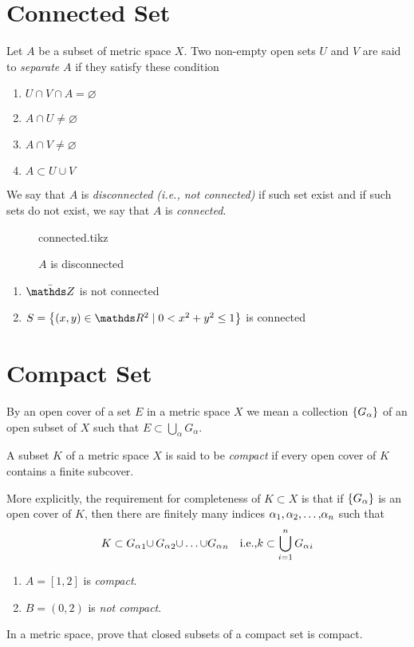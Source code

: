 \documentclass[../main-sheet.tex]{subfiles}
\begin{document}
\section{Connected Set}
Let $ A $ be a subset of metric space $ X $. Two non-empty open sets $ U $ and $ V $ are said to \emph{separate} $ A $ if they satisfy these condition
\begin{enumerate}[noitemsep,label=(\roman*)]
    \item $ U\cap V\cap A=\varnothing $
    \item $ A\cap U\neq\varnothing $
    \item $ A\cap V\neq \varnothing $
    \item $ A\subset U\cup V $
\end{enumerate}
We say that $ A  $ is \emph{disconnected (i.e., not connected)} if such set exist and if such sets do not exist, we say that $ A $ is \emph{connected}.
\begin{figure}[H]
    \centering
    {connected.tikz}
    \caption{$ A $ is disconnected}
    \label{fig:conSet}
\end{figure}
\begin{ex}
    \hfill
    \begin{enumerate}[label=(\roman*)]
        \item $ \bar{\Z} $ is not connected
        \item $ S=\set{(x,y)\in\R^2\mid 0<x^2+y^2\leq 1} $ is connected
    \end{enumerate}
\end{ex}
\section{Compact Set}
By an open cover of a set $ E $ in a metric space $ X $ we mean a collection $ \left\{G_\alpha\right\} $ of an open subset of $ X $ such that $ E\subset \bigcup_\alpha G_\alpha $.

A subset $ K $ of a metric space $ X $ is said to be \emph{compact} if every open cover of $ K $ contains a finite subcover.

More explicitly, the requirement for completeness of $ K\subset X $ is that if $ \left\{G_\alpha\right\} $ is an open cover of $ K $, then there are finitely many indices $ {\alpha}_1{,}\,{\alpha}_2{,}\dots{,}{\alpha}_n $ such that
\[K\subset {G_\alpha}_1{\cup}\,{G_\alpha}_2{\cup}\dots{\cup}{G_\alpha}_n\quad \text{i.e.,}k\subset \bigcup_{i=1}^n {G_\alpha}_i\]
\begin{ex}
    \hfill
    \begin{enumerate}[label=(\roman*)]
        \item $ A=[1, 2] $ is \emph{compact}.
        \item $ B=(0, 2) $ is \emph{not compact}.
    \end{enumerate}
\end{ex}
\begin{thm}
    In a metric space, prove that closed subsets of a compact set is compact.
\end{thm}
\end{document}
